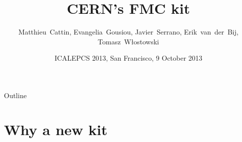 \documentclass[compress,red]{beamer}
\title[CERN's FMC kit] %
{CERN's FMC kit}
\author[Matthieu Cattin] %
{\mbox{Matthieu Cattin}, \mbox{Evangelia Gousiou}, \mbox{Javier Serrano}, \mbox{Erik van der Bij}, \mbox{Tomasz W\l{}ostowski}}
\institute%
{
  CERN, Geneva, Switzerland
 }
\date[ICALEPCS 2013] %
{ICALEPCS 2013, San Francisco, 9 October 2013}
\begin{document}
\begin{frame}
  \titlepage
\end{frame}

\begin{frame}{Outline}
  \tableofcontents
\end{frame}







\section{Why a new kit}

\subsection*{}
\end{document}
